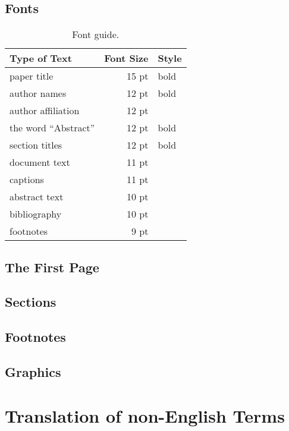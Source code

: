 \documentclass[11pt]{article}
\begin{document}
\subsection{Fonts}


\begin{table}[h]
\begin{center}
\begin{tabular}{|l|rl|}
\hline \bf Type of Text & \bf Font Size & \bf Style \\ \hline
paper title & 15 pt & bold \\
author names & 12 pt & bold \\
author affiliation & 12 pt & \\
the word ``Abstract'' & 12 pt & bold \\
section titles & 12 pt & bold \\
document text & 11 pt  &\\
captions & 11 pt & \\
abstract text & 10 pt & \\
bibliography & 10 pt & \\
footnotes & 9 pt & \\
\hline
\end{tabular}
\end{center}
\caption{\label{font-table} Font guide. }
\end{table}

\subsection{The First Page}
\label{ssec:first}

\subsection{Sections}

\subsection{Footnotes}


\subsection{Graphics}

\section{Translation of non-English Terms}
\end{document}
